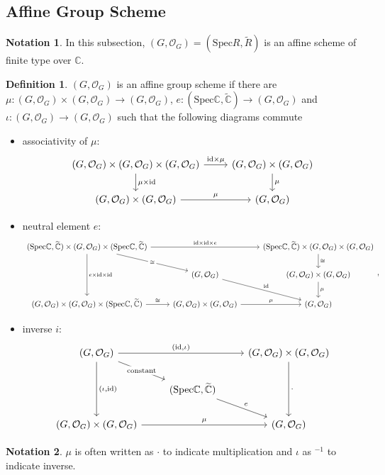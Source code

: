 \documentclass{article}
\theoremstyle{definition}
\newtheorem{definition}{Definition}
\newtheorem*{notation}{Notation}
\newcommand{\Spec}{\mathrm{Spec}}
\newcommand{\ssheaf}[1]{\widetilde{#1}}
\newcommand{\so}[1]{(#1, \mathcal O_{#1})}
\newcommand{\id}{\mathrm{id}}
\newcommand{\sr}[1]{(\Spec{#1},\ssheaf{#1})}
\begin{document}
\subsection{Affine Group Scheme}
\begin{notation}
In this subsection, $\so G=\sr R$ is an affine scheme of finite type over $\mathbb C$.	
\end{notation}

\begin{definition}
$\so G$ is an affine group scheme if there are $\mu: \so G\times\so G\to\so G$, $e:(\Spec\mathbb C,\widetilde{\mathbb C})\to\so G$ and $\iota:\so G\to\so G$ such that the following diagrams commute
\begin{itemize}
\item associativity of $\mu$:
\begin{equation*}
\begin{tikzcd}
\so G\times\so G\times\so G \arrow[r,"{\id\times\mu}"] \arrow[d,"\mu\times\id"] & 
\so G\times\so G\arrow[d, "\mu"] \\
\so G\times\so G \arrow[r, "\mu"] & \so G
\end{tikzcd}
\end{equation*}


\item neutral element $e$:
\begin{equation*}
\begin{tikzcd}
\sr{\mathbb C}\times\so G\times\sr{\mathbb C}\arrow[rr,"{\id\times\id\times e}"]\arrow[rd, "{\cong}" description]
\arrow[dd,"{e\times\id\times\id}"] 
& & 
\sr{\mathbb C}\times\so G\times\so G
\arrow[d,"\cong"] \\
& \so G \arrow[rd, "\id"]& \so G\times\so G\arrow[d, "\mu"] \\
\so G\times\so G\times\sr{\mathbb C}\arrow[r,"\cong"] & \so G\times\so G\arrow[r, "\mu"] &\so G
\end{tikzcd},
\end{equation*}

\item inverse $i$:
\begin{equation*}
\begin{tikzcd}
    \so G\arrow[rr,"{(\id,\iota)}"]
    \arrow[rd, "\text{constant}" description] \arrow[dd, "{(\iota, \id)}"] & & \so G\times \so G \arrow[dd, "\cdot"] \\
	& \sr{\mathbb C} \arrow[rd, "e"] & \\
\so G\times\so G\arrow[rr, "\mu"] & & \so G
\end{tikzcd}
\end{equation*}

\end{itemize}

\begin{notation}
$\mu$ is often written as $\cdot$ to indicate multiplication and $\iota$ as $^{-1}$ to indicate inverse.
\end{notation}
\label{def:group-scheme}
\end{definition}
\end{document}
